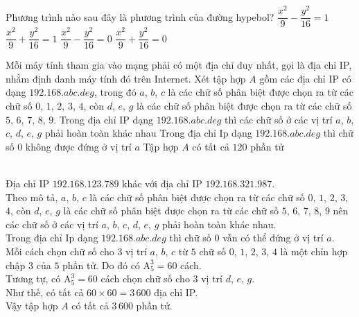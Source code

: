 \begin{ex}%
Phương trình nào sau đây là phương trình của đường hypebol?
\choice
{\True $\dfrac{x^2}{9} - \dfrac{y^2}{16} = 1$}
{$\dfrac{x^2}{9} + \dfrac{y^2}{16} = 1$}
{$\dfrac{x^2}{9} - \dfrac{y^2}{16} = 0$}
{$\dfrac{x^2}{9} + \dfrac{y^2}{16} = 0$}
\end{ex}
\TNTF
\begin{ex}%
Mỗi máy tính tham gia vào mạng phải có một địa chỉ duy nhất, gọi là địa chỉ IP, nhằm định danh máy tính đó trên Internet. Xét tập hợp $A$ gồm các địa chỉ IP có dạng $192.168.abc.deg$, trong đó $a$, $b$, $c$ là các chữ số phân biệt được chọn ra từ các chữ số $0$, $1$, $2$, $3$, $4$, còn $d$, $e$, $g$ là các chữ số phân biệt được chọn ra từ các chữ số $5$, $6$, $7$, $8$, $9$.
{\True Trong địa chỉ IP dạng $192.168.abc.deg$ thì các chữ số ở các vị trí $a$, $b$, $c$, $d$, $e$, $g$ phải hoàn toàn khác nhau}
{Trong địa chỉ Ip dạng $192.168.abc.deg$ thì chữ số $0$ không được đứng ở vị trí $a$}
{Tập hợp $A$ có tất cả $120$ phần tử}
\loigiai
{\begin{itemchoice}
\\
Địa chỉ IP $192.168.123.789$ khác với địa chỉ IP $192.168.321.987$.
\\
Theo mô tả, $a$, $b$, $c$ là các chữ số phân biệt được chọn ra từ các chữ số $0$, $1$, $2$, $3$, $4$, còn $d$, $e$, $g$ là các chữ số phân biệt được chọn ra từ các chữ số $5$, $6$, $7$, $8$, $9$ nên các chữ số ở các vị trí $a$, $b$, $c$, $d$, $e$, $g$ phải hoàn toàn khác nhau.
\\
Trong địa chỉ Ip dạng $192.168.abc.deg$ thì chữ số $0$ vẫn có thể đứng ở vị trí $a$.
\\
Mỗi cách chọn chữ số cho $3$ vị trí $a$, $b$, $c$ từ $5$ chữ số $0$, $1$, $2$, $3$, $4$ là một chỉn hợp chập $3$ của $5$ phần tử. Do đó có $\mathrm{A}_5^3=60$ cách.\\
Tương tự, có $\mathrm{A}_5^3=60$ cách chọn chữ số cho $3$ vị trí $d$, $e$, $g$.\\
Như thế, có tất cả $60\times 60=3\,600$ địa chỉ IP.\\
Vậy tập hợp $A$ có tất cả $3\,600$ phần tử.
\end{itemchoice}

}
\end{ex}

